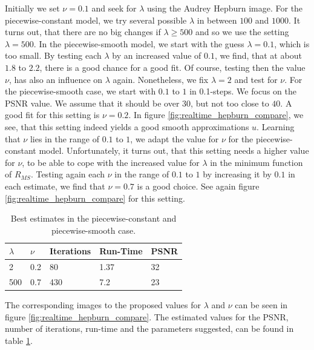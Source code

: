 \documentclass{scrreprt}
\begin{document}
            Initially we set $\nu = 0.1$ and seek for $\lambda$ using the Audrey Hepburn image. For the piecewise-constant model, we try several possible $\lambda$ in between $100$ and $1000$. It turns out, that there are no big changes if $\lambda \ge 500$ and so we use the setting $\lambda = 500$. In the piecewise-smooth model, we start with the guess $\lambda = 0.1$, which is too small. By testing each $\lambda$ by an increased value of $0.1$, we find, that at about $1.8$ to $2.2$, there is a good chance for a good fit. Of course, testing then the value $\nu$, has also an influence on $\lambda$ again. Nonetheless, we fix $\lambda = 2$ and test for $\nu$. For the piecewise-smooth case, we start with $0.1$ to $1$ in 0.1-steps. We focus on the PSNR value. We assume that it should be over $30$, but not too close to $40$. A good fit for this setting is $\nu = 0.2$. In figure \ref{fig:realtime_hepburn_compare}, we see, that this setting indeed yields a good smooth approximations $u$. Learning that $\nu$ lies in the range of $0.1$ to $1$, we adapt the value for $\nu$ for the piecewise-constant model. Unfortunately, it turns out, that this setting needs a higher value for $\nu$, to be able to cope with the increased value for $\lambda$ in the minimum function of $R_{MS}$. Testing again each $\nu$ in the range of $0.1$ to $1$ by increasing it by $0.1$ in each estimate, we find that $\nu = 0.7$ is a good choice. See again figure \ref{fig:realtime_hepburn_compare} for this setting.

            \begin{table}[!ht]
                \centering
                \begin{tabular}{| l | l | l | l | l |}
                \hline
                $\lambda$ & $\nu$ & Iterations & Run-Time & PSNR \\ \hline\hline
                2 & 0.2 & 80 & 1.37 & 32 \\ \hline
                500 & 0.7 & 430 & 7.2 & 23 \\ \hline
                \end{tabular}
                \caption[Comparison of $\lambda$ and $\nu$ in the Mumford-Shah real-time framework.]{Best estimates in the piecewise-constant and piecewise-smooth case.}
                \label{tab:best_parameters_rt}
            \end{table}

            The corresponding images to the proposed values for $\lambda$ and $\nu$ can be seen in figure \ref{fig:realtime_hepburn_compare}. The estimated values for the PSNR, number of iterations, run-time and the parameters suggested, can be found in table \ref{tab:best_parameters_rt}.
\end{document}
